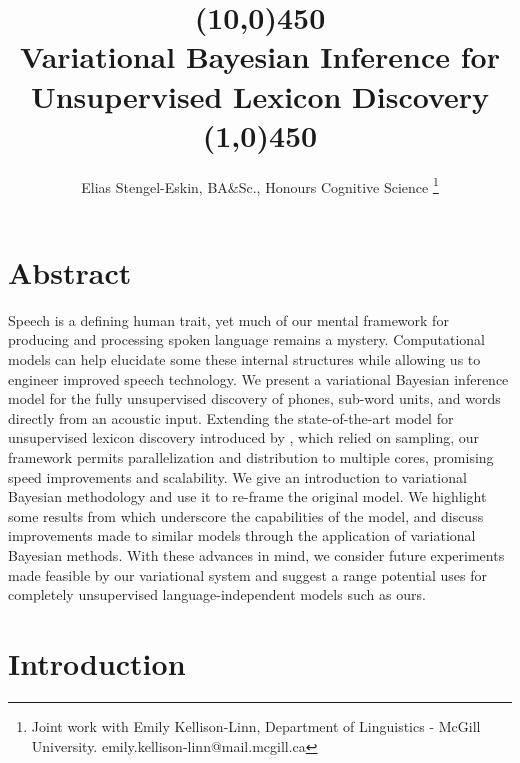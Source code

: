 \documentclass[12pt,letterpaper]{article}
\title{\vspace{-4em} \line(10,0){450}\\ Variational Bayesian Inference for Unsupervised Lexicon Discovery\\\vspace{-.7em} \line(1,0){450}}
\author{Elias Stengel-Eskin, BA\&Sc., Honours Cognitive Science \footnote{Joint work with Emily Kellison-Linn, Department of Linguistics - McGill University. emily.kellison-linn@mail.mcgill.ca}}
\date{}
\begin{document}

\maketitle

\section{Abstract}


Speech is a defining human trait, yet much of our mental framework for producing and processing spoken language remains a mystery. Computational models can help elucidate some these internal structures while allowing us to engineer improved speech technology. We present a variational Bayesian inference model for the fully unsupervised discovery of phones, sub-word units, and words directly from an acoustic input. Extending the state-of-the-art model for unsupervised lexicon discovery introduced by \citet{lee:2015}, which relied on sampling, our framework permits  parallelization and distribution to multiple cores, promising speed improvements and scalability. We give an introduction to variational Bayesian methodology and use it to re-frame the original model. We highlight some results from \citet{lee:2015} which underscore the capabilities of the model, and discuss improvements made to similar models through the application of variational Bayesian methods. With these advances in mind, we consider future experiments made feasible by our variational system and suggest a range potential uses for completely unsupervised language-independent models such as ours. 

\section{Introduction}
\end{document}
